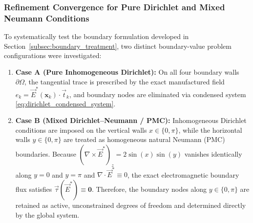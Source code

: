 \documentclass[VANCOUVER]{USG}
\begin{document}
\subsubsection{Refinement Convergence for Pure Dirichlet and Mixed Neumann Conditions}
\label{subsubsec:mms_dirichlet_neumann}

To systematically test the boundary formulation developed in Section~\ref{subsec:boundary_treatment}, two distinct boundary-value problem configurations were investigated:
\begin{enumerate}
    \item \textbf{Case A (Pure Inhomogeneous Dirichlet):} On all four boundary walls $\partial\Omega$, the tangential trace is prescribed by the exact manufactured field $e_k = \vec{E}^*(\mathbf{x}_k) \cdot \vec{t}_k$, and boundary nodes are eliminated via condensed system \eqref{eq:dirichlet_condensed_system}.
    \item \textbf{Case B (Mixed Dirichlet--Neumann / PMC):} Inhomogeneous Dirichlet conditions are imposed on the vertical walls $x \in \{0, \pi\}$, while the horizontal walls $y \in \{0, \pi\}$ are treated as homogeneous natural Neumann (PMC) boundaries. Because $(\nabla \times \vec{E}^*)_z = 2\sin(x)\sin(y)$ vanishes identically along $y=0$ and $y=\pi$ and $\nabla \cdot \vec{E}^* \equiv 0$, the exact electromagnetic boundary flux satisfies $\vec{\tau}(\vec{E}^*) \equiv \mathbf{0}$. Therefore, the boundary nodes along $y \in \{0, \pi\}$ are retained as active, unconstrained degrees of freedom and determined directly by the global system.
\end{enumerate}
\end{document}
